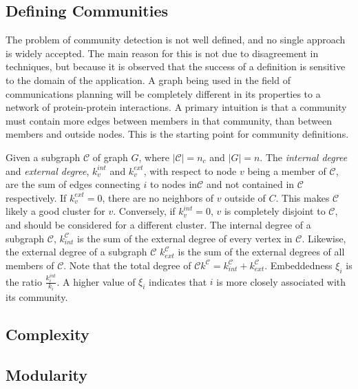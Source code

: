 \subsection{Defining Communities}

The problem of community detection is not well defined, and no single approach is widely accepted. The main reason for this is not due to disagreement in techniques, but because it is observed that the success of a definition is sensitive to the domain of the application. A graph being used in the field of communications planning will be completely different in its properties to a network of protein-protein interactions. A primary intuition is that a community must contain more edges between members in that community, than between members and outside nodes. This is the starting point for community definitions. 

Given a subgraph $\mathcal{C}$ of graph $G$, where $|\mathcal{C}|= n_c$ and $|G|=n$. The \textit{internal degree} and \textit{external degree}, $k^{int}_v$ and $k^{ext}_v$, with respect to node $v$ being a member of $\mathcal{C}$, are the sum of edges connecting $i$ to nodes in$\mathcal{C}$ and not contained in $\mathcal{C}$ respectively. If $k^{ext}_v=0$, there are no neighbors of $v$ outside of $C$. This makes $\mathcal{C}$ likely a good cluster for $v$. Conversely, if $k^{int}_v=0$, $v$ is completely disjoint to $\mathcal{C}$, and should be considered for a different cluster. The internal degree of a subgraph $\mathcal{C}$, $k^{\mathcal{C}}_{int}$ is the sum of the external degree of every vertex in $\mathcal{C}$. Likewise, the external degree of a subgraph $\mathcal{C}$ $k^{\mathcal{C}}_{ext}$ is the sum of the external degrees of all members of $\mathcal{C}$. Note that the total degree of $\mathcal{C} k^\mathcal{C}=k^{\mathcal{C}}_{int}+k^{\mathcal{C}}_{ext}$.
Embeddedness $\xi_i$ is the ratio $\frac{k^{int}_i}{k_i}$. A higher value of $\xi_i$ indicates that $i$ is more closely associated with its community.   


\subsection{Complexity}


\subsection{Modularity}



